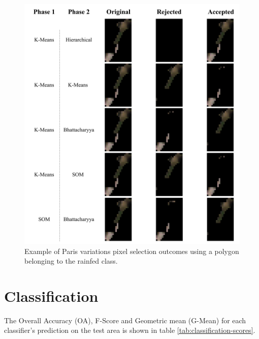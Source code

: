 \documentclass[12pt, english, openany]{book}
\begin{document}
\begin{figure}[H]
	\centering
	\includegraphics[width=1\linewidth]{paris_variations_results.png}
  \caption[Example of Paris variations pixel selection outcomes.]{Example of
  Paris variations pixel selection outcomes using a polygon belonging to the 
  rainfed class.}
  \label{fig:paris-variations-rainfed-example}
\end{figure}


\section{Classification}

The Overall Accuracy (OA), F-Score and Geometric mean (G-Mean) for each
classifier's prediction on the test area is shown in table
\ref{tab:classification-scores}.
\end{document}
